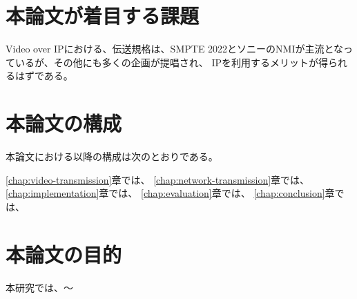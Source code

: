 \section{本論文が着目する課題}
Video over IPにおける、伝送規格は、SMPTE 2022とソニーのNMIが主流となっているが、その他にも多くの企画が提唱され、
IPを利用するメリットが得られるはずである。

\section{本論文の構成}
本論文における以降の構成は次のとおりである。

\ref{chap:video-transmission}章では、
\ref{chap:network-transmission}章では、
\ref{chap:implementation}章では、
\ref{chap:evaluation}章では、
\ref{chap:conclusion}章では、

\section{本論文の目的}
本研究では、〜

